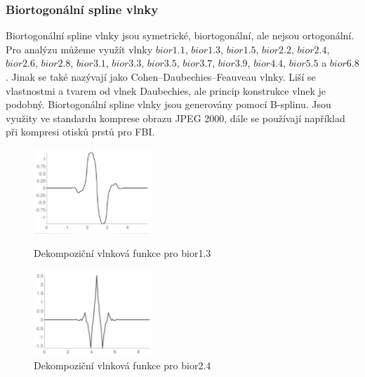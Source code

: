 \subsubsection{Biortogonální spline vlnky}
Biortogonální spline vlnky jsou symetrické, biortogonální, ale nejsou ortogonální. Pro analýzu můžeme využít vlnky $bior1.1$, $bior1.3$, $bior1.5$, $bior2.2$, $bior2.4$, $bior2.6$, $bior2.8$, $bior 3.1$, $bior3.3$, $bior3.5$, $bior3.7$, $bior3.9$, $bior4.4$, $bior5.5$ a $bior6.8$. \cite{PyWaveletsBrowser} Jinak se také nazývají jako Cohen–Daubechies–Feauveau vlnky. Liší se vlastnostmi a tvarem od vlnek Daubechies, ale princip konstrukce vlnek je podobný. Biortogonální spline vlnky jsou generovány pomocí B-splinu. \cite{GeneralizedBiorthogonalDaubechiesWavelets} Jsou využity ve standardu komprese obrazu JPEG 2000, dále se používají například při kompresi otisků prstů pro FBI. 

\begin{figure}[!htbp]
  \begin{minipage}[b]{0.5\linewidth}
    \centering
    \includegraphics[width=170px]{obrazky-figures/bior13wavelet.PNG}
    \caption{Dekompoziční vlnková funkce pro bior1.3 \cite{PyWaveletsBrowser}}
  \end{minipage}
  \hspace{0.5cm}
  \begin{minipage}[b]{0.5\linewidth}
    \centering
    \includegraphics[width=170px]{obrazky-figures/bior24wavelet.PNG}
    \caption{Dekompoziční vlnková funkce pro bior2.4 \cite{PyWaveletsBrowser}}
  \end{minipage}
\end{figure}


